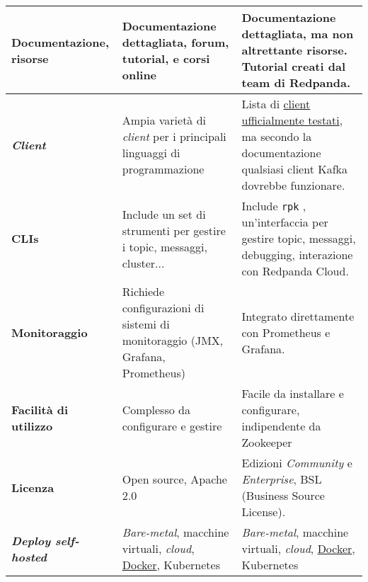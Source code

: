 \begin{longtable}{|>{\centering\arraybackslash}p{}|>{\centering\arraybackslash}p{}|>{\centering\arraybackslash}p{}|}
	\textbf{Documentazione, risorse}     & Documentazione dettagliata, forum, tutorial, e corsi online                                                                                                 & Documentazione dettagliata, ma non altrettante risorse. Tutorial creati dal team di Redpanda.                                                                                    \\
	\hline
	\textbf{\textit{Client}}             & Ampia varietà di \textit{client} per i principali linguaggi di programmazione                                                                               & Lista di \href{https://docs.redpanda.com/current/develop/kafka-clients/}{client ufficialmente testati}, ma secondo la documentazione qualsiasi client Kafka dovrebbe funzionare. \\
	\hline
	\textbf{CLIs}                        & Include un set di strumenti per gestire i topic, messaggi, cluster...                                                                                       & Include \texttt{rpk} , un'interfaccia per gestire topic, messaggi, debugging, interazione con Redpanda Cloud.                                                                    \\
	\hline
	\textbf{Monitoraggio}                & Richiede configurazioni di sistemi di monitoraggio (JMX, Grafana, Prometheus)                                                                               & Integrato direttamente con Prometheus e Grafana.                                                                                                                                 \\
	\hline
	\textbf{Facilità di utilizzo}        & Complesso da configurare e gestire                                                                                                                          & Facile da installare e configurare, indipendente da Zookeeper                                                                                                                    \\
	\hline
	\textbf{Licenza}                     & Open source, Apache 2.0                                                                                                                                     & Edizioni \textit{Community} e \textit{Enterprise}, BSL (Business Source License).                                                                                                \\
	\hline
	\textbf{\textit{Deploy self-hosted}} & \textit{Bare-metal}, macchine virtuali, \textit{cloud}, \href{https://7last.github.io/docs/rtb/documentazione-interna/glossario#docker}{Docker}, Kubernetes & \textit{Bare-metal}, macchine virtuali, \textit{cloud}, \href{https://7last.github.io/docs/rtb/documentazione-interna/glossario#docker}{Docker}, Kubernetes                      \\

\end{longtable}
